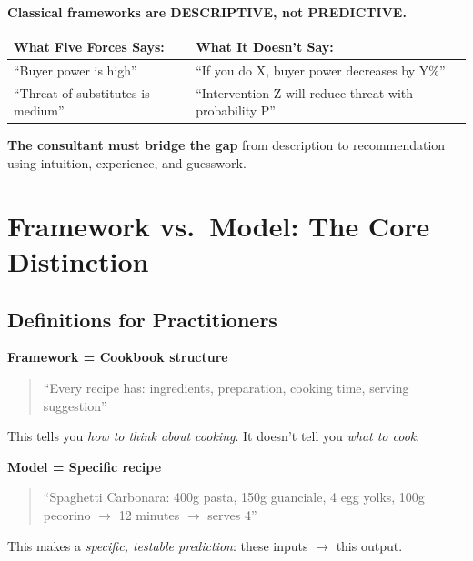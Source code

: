 \begin{tcolorbox}[colback=red!5!white, colframe=red!75!black,
    title=\textbf{The Missing Element}]

\textbf{Classical frameworks are DESCRIPTIVE, not PREDICTIVE.}

\begin{center}
\renewcommand{\arraystretch}{1.3}
\begin{tabular}{@{}p{6cm}p{6cm}@{}}
\textbf{What Five Forces Says:} & \textbf{What It Doesn't Say:} \\
\midrule
``Buyer power is high'' & ``If you do X, buyer power decreases by Y\%'' \\
``Threat of substitutes is medium'' & ``Intervention Z will reduce threat with probability P'' \\
\end{tabular}
\end{center}

\textbf{The consultant must bridge the gap} from description to recommendation
using intuition, experience, and guesswork.

\end{tcolorbox}



\section{Framework vs.\ Model: The Core Distinction}
\label{sec:consulting-fw-model}

\subsection{Definitions for Practitioners}

\begin{tcolorbox}[colback=blue!5!white, colframe=blue!75!black,
    title=\textbf{The Cookbook Analogy}]

\textbf{Framework = Cookbook structure}
\begin{quote}
``Every recipe has: ingredients, preparation, cooking time, serving suggestion''
\end{quote}
This tells you \textit{how to think about cooking}. It doesn't tell you \textit{what to cook}.

\textbf{Model = Specific recipe}
\begin{quote}
``Spaghetti Carbonara: 400g pasta, 150g guanciale, 4 egg yolks, 100g pecorino $\rightarrow$ 12 minutes $\rightarrow$ serves 4''
\end{quote}
This makes a \textit{specific, testable prediction}: these inputs $\rightarrow$ this output.

\end{tcolorbox}

